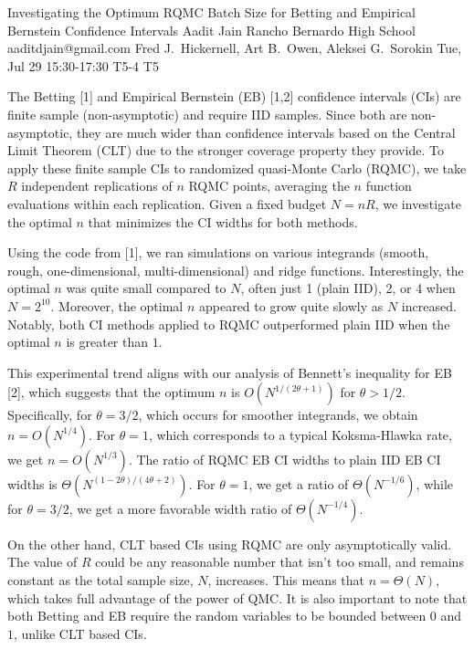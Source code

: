 \begin{talk}
  {Investigating the Optimum RQMC Batch Size for Betting and Empirical Bernstein Confidence Intervals}%
  {Aadit Jain}%
  {Rancho Bernardo High School}%
  {aaditdjain@gmail.com}%
  {Fred J.\ Hickernell, Art B.\ Owen, Aleksei G.\ Sorokin}%
  {}%
  {Tue, Jul 29 15:30-17:30}%
  {T5-4}%
  {T5}%
  
				
			

The Betting [1] and Empirical Bernstein (EB) [1,2] confidence intervals (CIs) are finite sample (non-asymptotic) and require IID samples. Since both are non-asymptotic, they are much wider than confidence intervals based on the Central Limit Theorem (CLT) due to the stronger coverage property they provide. To apply these finite sample CIs to randomized quasi-Monte Carlo (RQMC), we take $R$ independent replications of $n$ RQMC points, averaging the $n$ function evaluations within each replication. Given a fixed budget $N = nR$, we investigate the optimal $n$ that minimizes the CI widths for both methods.  

Using the code from [1], we ran simulations on various integrands (smooth, rough, one-dimensional, multi-dimensional) and ridge functions. Interestingly, the optimal $n$ was quite small compared to $N$, often just 1 (plain IID), 2, or 4 when $N = 2^{10}$. Moreover, the optimal $n$ appeared to grow quite slowly as $N$ increased. Notably, both CI methods applied to RQMC outperformed plain IID when the optimal $n$ is greater than $1$.  

This experimental trend aligns with our analysis of Bennett’s inequality for EB [2], which suggests that the optimum $n$ is $O(N^{1/(2\theta + 1)})$ for $\theta > 1/2$. 
Specifically, for $\theta = 3/2$, which occurs for smoother integrands, we obtain $n = O(N^{1/4})$. For $\theta = 1$, which corresponds to a typical Koksma-Hlawka rate, we get $n = O(N^{1/3})$. The ratio of RQMC EB CI widths to plain IID EB CI widths is $\Theta( N^{(1-2\theta)/(4\theta+2)})$. For $\theta=1$,
we get a ratio of $\Theta(N^{-1/6})$,
while for $\theta=3/2$,
we get a more favorable width ratio of $\Theta(N^{-1/4})$. 


On the other hand, CLT based CIs using RQMC  are only asymptotically valid. The value of $R$ could be any reasonable number that isn't too small, and remains constant as the total sample size, $N$, increases.  This means that $n = \Theta(N)$, which takes full advantage of the power of QMC.  It is also important to note that both Betting and EB require the random variables to be bounded between $0$ and $1$, unlike CLT based CIs. 



\end{talk}
